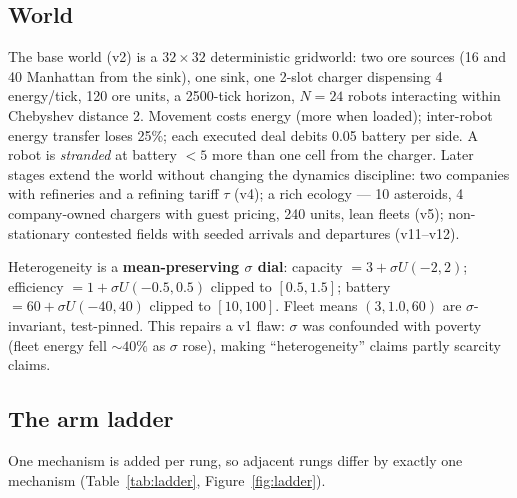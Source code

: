 \documentclass[sigconf,nonacm]{acmart}
\begin{document}
\subsection{World}\label{sec:world}

The base world (v2) is a $32\times32$ deterministic gridworld: two ore
sources (16 and 40 Manhattan from the sink), one sink, one 2-slot charger
dispensing 4 energy/tick, 120 ore units, a 2500-tick horizon, $N{=}24$
robots interacting within Chebyshev distance 2. Movement costs energy (more
when loaded); inter-robot energy transfer loses 25\%; each executed deal
debits 0.05 battery per side. A robot is \emph{stranded} at battery $<5$
more than one cell from the charger. Later stages extend the world without
changing the dynamics discipline: two companies with refineries and a
refining tariff $\tau$ (v4); a rich ecology --- 10 asteroids, 4
company-owned chargers with guest pricing, 240 units, lean fleets (v5);
non-stationary contested fields with seeded arrivals and departures
(v11--v12).

Heterogeneity is a \textbf{mean-preserving $\sigma$ dial}: capacity $= 3 +
\sigma U(-2,2)$; efficiency $= 1 + \sigma U(-0.5,0.5)$ clipped to
$[0.5,1.5]$; battery $= 60 + \sigma U(-40,40)$ clipped to $[10,100]$. Fleet
means $(3, 1.0, 60)$ are $\sigma$-invariant, test-pinned. This repairs a v1
flaw: $\sigma$ was confounded with poverty (fleet energy fell ${\sim}40\%$
as $\sigma$ rose), making ``heterogeneity'' claims partly scarcity claims.

\subsection{The arm ladder}\label{sec:ladder}

One mechanism is added per rung, so adjacent rungs differ by exactly one
mechanism (Table~\ref{tab:ladder}, Figure~\ref{fig:ladder}).
\end{document}
